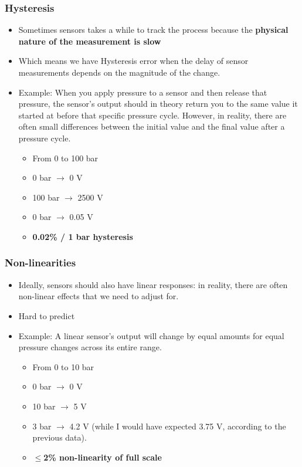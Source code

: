 \subsubsection{Hysteresis}
\begin{itemize}
    \item Sometimes sensors takes a while to track the process because the \textbf{physical nature of the measurement is slow}
    \item Which means we have Hysteresis error when the delay of sensor measurements depends on the magnitude of the change.
    
    \item Example: When you apply pressure to a sensor and then release that pressure, the sensor's output should in theory return you to the same value it started at before that specific pressure cycle. However, in reality, there are often small differences between the initial value and the final value after a pressure cycle.
    \begin{itemize}
        \item From 0 to 100 bar
        \item 0 bar $\rightarrow$ 0 V
        \item 100 bar $\rightarrow$ 2500 V
        \item 0 bar $\rightarrow$ 0.05 V
        \item \textbf{0.02\% / 1 bar hysteresis}
    \end{itemize}
\end{itemize}

\subsubsection{Non-linearities}
\begin{itemize}
    \item Ideally, sensors should also have linear responses: in reality, there are often non-linear effects that we need to adjust for.
    
    \item Hard to predict
    
    \item Example: A linear sensor's output will change by equal amounts for equal pressure changes across its entire range.
    \begin{itemize}
        \item From 0 to 10 bar
        \item 0 bar $\rightarrow$ 0 V
        \item 10 bar $\rightarrow$ 5 V
        \item 3 bar $\rightarrow$ 4.2 V (while I would have expected 3.75 V, according to the previous data).
        \item \textbf{$\leq$2\% non-linearity of full scale}
    \end{itemize}
\end{itemize}

